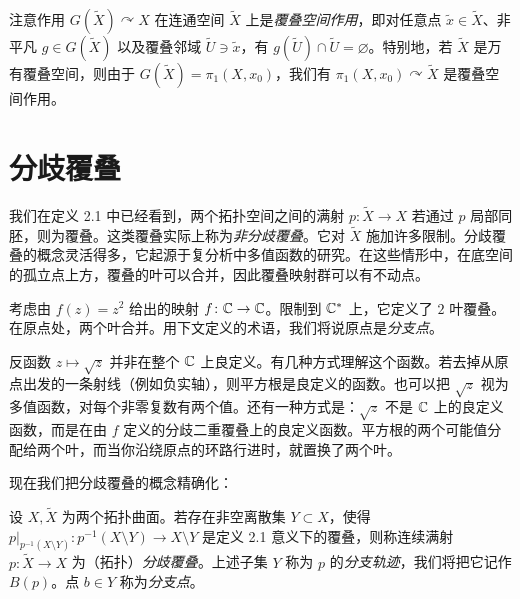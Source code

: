 
注意作用 $G(\tilde X)\curvearrowright X$ 在连通空间 $\tilde X$ 上是\emph{覆叠空间作用}，即对任意点 $\tilde x\in\tilde X$、非平凡 $g\in G(\tilde X)$ 以及覆叠邻域 $\tilde U\ni\tilde x$，有 $g(\tilde U)\cap\tilde U=\varnothing$。特别地，若 $\tilde X$ 是万有覆叠空间，则由于 $G(\tilde X)=\pi_1(X,x_0)$，我们有 $\pi_1(X,x_0)\curvearrowright\tilde X$ 是覆叠空间作用。


\section{分歧覆叠}

我们在定义 2.1 中已经看到，两个拓扑空间之间的满射 $p\colon\tilde X\to X$ 若通过 $p$ 局部同胚，则为覆叠。这类覆叠实际上称为\emph{非分歧覆叠}。它对 $\tilde X$ 施加许多限制。分歧覆叠的概念灵活得多，它起源于复分析中多值函数的研究。在这些情形中，在底空间的孤立点上方，覆叠的叶可以合并，因此覆叠映射群可以有不动点。

\begin{example}[2.13]
考虑由 $f(z)=z^2$ 给出的映射 $f\colon\mathbb{C}\to\mathbb{C}$。限制到 $\mathbb{C}^*$ 上，它定义了 $2$ 叶覆叠。在原点处，两个叶合并。用下文定义的术语，我们将说原点是\emph{分支点}。
\end{example}

反函数 $z\mapsto\sqrt{z}$ 并非在整个 $\mathbb{C}$ 上良定义。有几种方式理解这个函数。若去掉从原点出发的一条射线（例如负实轴），则平方根是良定义的函数。也可以把 $\sqrt{z}$ 视为多值函数，对每个非零复数有两个值。还有一种方式是：$\sqrt{z}$ 不是 $\mathbb{C}$ 上的良定义函数，而是在由 $f$ 定义的分歧二重覆叠上的良定义函数。平方根的两个可能值分配给两个叶，而当你沿绕原点的环路行进时，就置换了两个叶。

现在我们把分歧覆叠的概念精确化：

\begin{definition}[2.14]
设 $X,\tilde X$ 为两个拓扑曲面。若存在非空离散集 $Y\subset X$，使得 $p|_{p^{-1}(X\setminus Y)}\colon p^{-1}(X\setminus Y)\to X\setminus Y$ 是定义 2.1 意义下的覆叠，则称连续满射 $p\colon\tilde X\to X$ 为（拓扑）\emph{分歧覆叠}。上述子集 $Y$ 称为 $p$ 的\emph{分支轨迹}，我们将把它记作 $B(p)$。点 $b\in Y$ 称为\emph{分支点}。
\end{definition}

